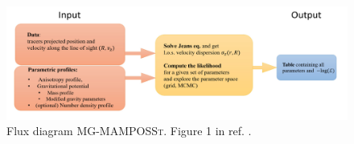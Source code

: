 \begin{figure}
    \centering
    \includegraphics[width=0.99\linewidth]{Images/Chapter4/Flux diagram MG-MAMPOSSt.png}
    \caption[Flux diagram \textsc{MG-MAMPOSSt}]{Flux diagram \textsc{
    MG-MAMPOSSt}. Figure 1 in ref. \cite{MG-MAMPOSST:a-code-to-test-modifications-of-gravity-with-internal-kinematics-and-lensing-analyses-of-galaxy-clusters}.}
    \label{Flux diagram MG-MAMPOSSt}
\end{figure}

